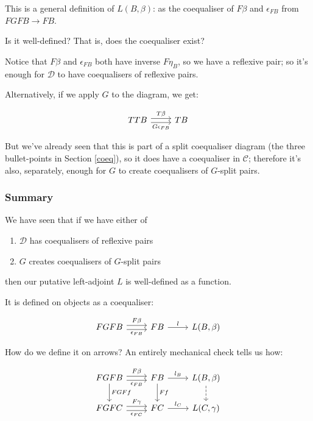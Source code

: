 \documentclass[11pt]{amsart}
\begin{document}
This is a general definition of $L(B, \beta)$: as the coequaliser of $F\beta$ and $\epsilon_{FB}$ from $FGFB \to FB$.

Is it well-defined? That is, does the coequaliser exist?

Notice that $F\beta$ and $\epsilon_{FB}$ both have inverse $F \eta_B$, so we have a reflexive pair; so it's enough for $\mathcal{D}$ to have coequalisers of reflexive pairs.

Alternatively, if we apply $G$ to the diagram, we get:

\[
\begin{tikzcd}
TTB \arrow[r, shift left, "T \beta"] \arrow[r, shift right, "G \epsilon_{F B}"']
& TB
\end{tikzcd}
\]

But we've already seen that this is part of a split coequaliser diagram (the three bullet-points in Section \ref{coeq}), so it does have a coequaliser in $\mathcal{C}$;
therefore it's also, separately, enough for $G$ to create coequalisers of $G$-split pairs.

\subsubsection{Summary} \label{summaryL}

We have seen that if we have either of

\begin{enumerate}
\item $\mathcal{D}$ has coequalisers of reflexive pairs
\item $G$ creates coequalisers of $G$-split pairs
\end{enumerate}

then our putative left-adjoint $L$ is well-defined as a function.

It is defined on objects as a coequaliser:

\[
\begin{tikzcd}
FGFB \arrow[r, shift left, "F \beta"] \arrow[r, shift right, "\epsilon_{F B}"']
& FB \arrow[r, "l"]
& L(B, \beta)
\end{tikzcd}
\]

How do we define it on arrows?
An entirely mechanical check tells us how:

\[
\begin{tikzcd}
FGFB
    \arrow[r, shift left, "F \beta"]
    \arrow[r, shift right, "\epsilon_{F B}"']
    \arrow[d, "FGFf"]
& FB
    \arrow[r, "l_B"]
    \arrow[d, "Ff"]
& L(B, \beta)
    \arrow[d, dashrightarrow]
\\
FGFC
    \arrow[r, shift left, "F \gamma"]
    \arrow[r, shift right, "\epsilon_{F C}"']
& FC
    \arrow[r, "l_C"]
& L(C, \gamma)
\end{tikzcd}
\]
\end{document}
